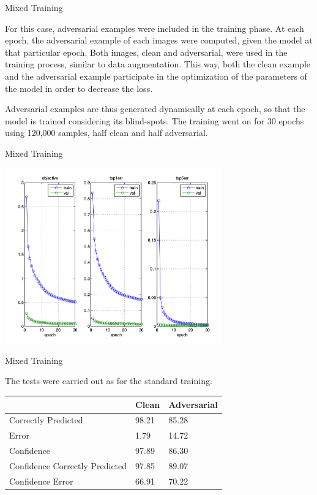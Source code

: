 \begin{tframe}{Mixed Training}

For this case, adversarial examples were included in the training phase. At each epoch, the adversarial example of each images were computed, given the model at that particular epoch. Both images, clean and adversarial, were used in the training process, similar to data augmentation. This way, both the clean example and the adversarial example participate in the optimization of the parameters of the model in order to decrease the loss.

\vspace{0.1in}

Adversarial examples are thus generated dynamically at each epoch, so that the model is trained considering its blind-spots.
The training went on for 30 epochs using 120,000 samples, half clean and half adversarial.

\end{tframe}

\begin{tframe}{Mixed Training}

\begin{center}
  \includegraphics[width=0.7\textwidth]{img/train-mix.png}
	\label{train-mix} 
\end{center}

\end{tframe}

\begin{tframe}{Mixed Training}

The tests were carried out as for the standard training.

\begin{table}[h]
\centering
\begin{tabular}{@{}lll@{}}
\toprule
                               & Clean & Adversarial \\ \midrule
Correctly Predicted            & 98.21 & 85.28       \\
Error                          & 1.79  & 14.72       \\
Confidence                     & 97.89 & 86.30       \\
Confidence Correctly Predicted & 97.85 & 89.07       \\
Confidence Error               & 66.91 & 70.22       \\ \bottomrule
\end{tabular}
\end{table}

\end{tframe}